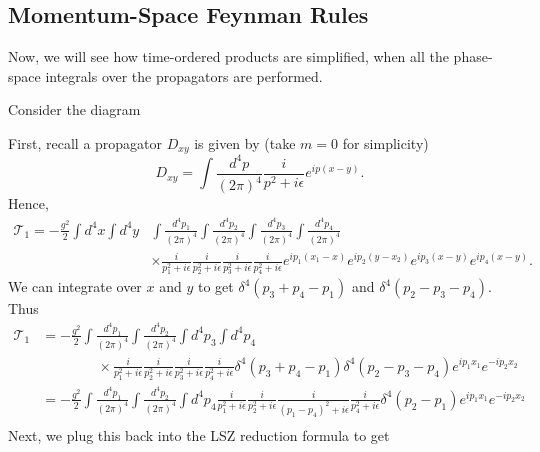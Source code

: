 \documentclass[11pt]{article}
\theoremstyle{definition}
\begin{document}
\subsection{Momentum-Space Feynman Rules}
Now, we will see how time-ordered products are simplified, when all the phase-space integrals over the propagators are performed.

Consider the diagram
\begin{center}
\end{center}
First, recall a propagator $D_{xy}$ is given by (take $m=0$ for simplicity)
\begin{equation}
    D_{xy} = \int \frac{d^4p}{(2\pi)^4} \frac{i}{p^2+i\epsilon}e^{ip(x-y)}.
\end{equation}
Hence,
\begin{equation}
\begin{aligned}
        \mathcal{T}_1 = -\frac{g^2}{2} \int d^4x \int d^4y &\int \frac{d^4p_1}{(2\pi)^4}\int \frac{d^4p_2}{(2\pi)^4}\int \frac{d^4p_3}{(2\pi)^4}\int \frac{d^4p_4}{(2\pi)^4} \\
        &\times \frac{i}{p_1^2+i\epsilon}\frac{i}{p_2^2+i\epsilon}\frac{i}{p_3^2+i\epsilon}\frac{i}{p_4^2+i\epsilon} e^{ip_1(x_1-x)}e^{ip_2(y-x_2)}e^{ip_3(x-y)}e^{ip_4(x-y)}.
\end{aligned}
\end{equation}
We can integrate over $x$ and $y$ to get $\delta^4(p_3+p_4-p_1)$ and $\delta^4(p_2-p_3-p_4)$. Thus
\begin{equation}
    \begin{aligned}
        \mathcal{T}_1 &= -\frac{g^2}{2} \int \frac{d^4p_1}{(2\pi)^4}\int \frac{d^4p_2}{(2\pi)^4}\int d^4p_3\int d^4p_4 \\
        &\qquad \qquad \times \frac{i}{p_1^2+i\epsilon}\frac{i}{p_2^2+i\epsilon}\frac{i}{p_3^2+i\epsilon}\frac{i}{p_4^2+i\epsilon} \delta^4(p_3+p_4-p_1) \delta^4(p_2-p_3-p_4) e^{ip_1x_1}e^{-ip_2x_2}\\
        &= -\frac{g^2}{2} \int \frac{d^4p_1}{(2\pi)^4}\int \frac{d^4p_2}{(2\pi)^4}\int d^4p_4\frac{i}{p_1^2+i\epsilon}\frac{i}{p_2^2+i\epsilon}\frac{i}{(p_1-p_4)^2+i\epsilon}\frac{i} {p_4^2+i\epsilon}\delta^4(p_2-p_1) e^{ip_1x_1}e^{-ip_2x_2}\\
    \end{aligned}
\end{equation}
Next, we plug this back into the LSZ reduction formula to get
\end{document}
